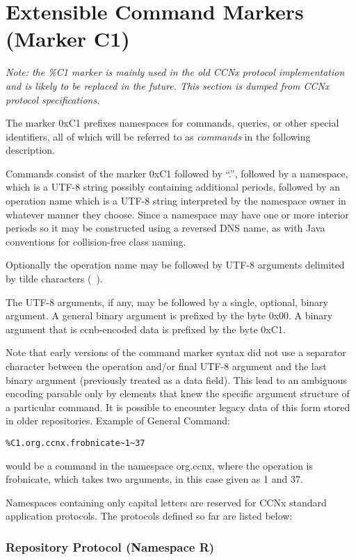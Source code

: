 \section{Extensible Command Markers (Marker C1)}

\emph{Note: the \%C1 marker is mainly used in the old CCNx protocol implementation and is likely to be replaced in the future. This section is dumped from CCNx protocol specifications.}


 The marker 0xC1 prefixes namespaces for commands, queries, or other special identifiers, all of which will be referred to as \emph{commands}
 in the following description.


 Commands consist of the marker 0xC1 followed by ``.'', followed by a namespace, which is a UTF-8 string possibly containing additional periods, followed by an operation name which is a UTF-8 string interpreted by the namespace owner in whatever manner they choose. Since a namespace may have one or more interior periods so it may be constructed using a reversed DNS name, as with Java conventions for collision-free class naming.


 Optionally the operation name may be followed by UTF-8 arguments delimited by tilde characters (~).


 The UTF-8 arguments, if any, may be followed by a single, optional, binary argument. A general binary argument is prefixed by the byte 0x00. A binary argument that is ccnb-encoded data is prefixed by the byte 0xC1.


 Note that early versions of the command marker syntax did not use a separator character between the operation and/or final UTF-8 argument and the last binary argument (previously treated as a data field). This lead to an ambiguous encoding parsable only by elements that knew the specific argument structure of a particular command. It is possible to encounter legacy data of this form stored in older repositories.
Example of General Command:
\begin{verbatim}
%C1.org.ccnx.frobnicate~1~37
\end{verbatim}


 would be a command in the namespace org.ccnx, where the operation is frobnicate, which takes two arguments, in this case given as 1 and 37.


 Namespaces containing only capital letters are reserved for CCNx standard application protocols. The protocols defined so far are listed below:
\subsubsection*{Repository Protocol (Namespace R)}


